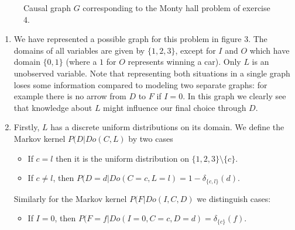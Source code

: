 \begin{gradedsolution}
  \begin{figure}[ht]
    \centering
  \caption{Causal graph $G$ corresponding to the Monty hall problem of exercise 4.}
  \label{fig:mh}
  \end{figure}
  \begin{enumerate}
    \item We have represented a possible graph for this problem in figure 3. The domains of all variables are given by $\{1,2,3\}$, except for $I$ and $O$ which have domain $\{0,1\}$ (where a $1$ for $O$ represents winning a car). Only $L$ is an unobserved variable. Note that representing both situations in a single graph loses some information compared to modeling two separate graphs: for example there is no arrow from $D$ to $F$ if $I=0$. In this graph we clearly see that knowledge about $L$ might influence our final choice through $D$.
    \item Firstly, $L$ has a discrete uniform distributions on its domain. We define the Markov kernel $P(D|Do(C, L)$ by two cases 
    \begin{itemize}
      \item If $c=l$ then it is the uniform distribution on $\{1,2,3\} \setminus \{c\}$. 
      \item If $c \neq l$, then $P(D=d|Do(C=c, L=l) = 1 - \delta_{\{c,l\}}(d)$.
    \end{itemize} 
    Similarly for the Markov kernel $P(F|Do(I, C, D)$ we distinguish cases:
    \begin{itemize}
      \item If $I=0$, then $P(F=f|Do(I=0, C=c, D=d) = \delta_{\{c\}}(f)$.

\end{itemize}
\end{enumerate}
\end{gradedsolution}
